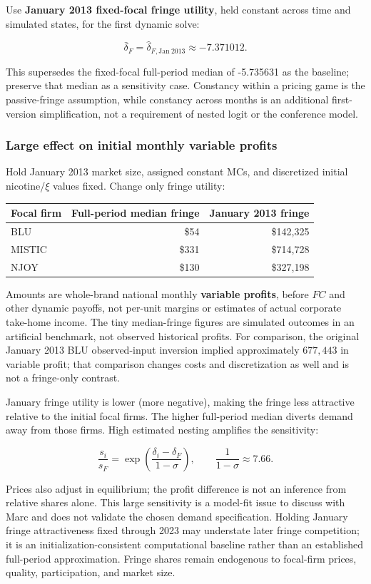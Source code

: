 \documentclass[10pt,]{article}
\begin{document}
Use \textbf{January 2013 fixed-focal fringe utility}, held constant
across time and simulated states, for the first dynamic solve:

\[
\bar\delta_F=\widehat\delta_{F,\mathrm{Jan\ 2013}}
\approx -7.371012.
\]

This supersedes the fixed-focal full-period median of -5.735631 as the
baseline; preserve that median as a sensitivity case. Constancy within a
pricing game is the passive-fringe assumption, while constancy across
months is an additional first-version simplification, not a requirement
of nested logit or the conference model.

\subsubsection{Large effect on initial monthly variable
profits}\label{large-effect-on-initial-monthly-variable-profits}

Hold January 2013 market size, assigned constant MCs, and discretized
initial nicotine/\(\xi\) values fixed. Change only fringe utility:

\begin{longtable}[]{@{}lrr@{}}
\toprule
Focal firm & Full-period median fringe & January 2013
fringe\tabularnewline
\midrule
\endhead
BLU & \$54 & \$142,325\tabularnewline
MISTIC & \$331 & \$714,728\tabularnewline
NJOY & \$130 & \$327,198\tabularnewline
\bottomrule
\end{longtable}

Amounts are whole-brand national monthly \textbf{variable profits},
before \(FC\) and other dynamic payoffs, not per-unit margins or
estimates of actual corporate take-home income. The tiny median-fringe
figures are simulated outcomes in an artificial benchmark, not observed
historical profits. For comparison, the original January 2013 BLU
observed-input inversion implied approximately \(677,443\) in variable
profit; that comparison changes costs and discretization as well and is
not a fringe-only contrast.

January fringe utility is lower (more negative), making the fringe less
attractive relative to the initial focal firms. The higher full-period
median diverts demand away from those firms. High estimated nesting
amplifies the sensitivity:

\[
\frac{s_i}{s_F}=\exp\!\left(\frac{\delta_i-\delta_F}{1-\sigma}\right),
\qquad \frac{1}{1-\sigma}\approx7.66.
\]

Prices also adjust in equilibrium; the profit difference is not an
inference from relative shares alone. This large sensitivity is a
model-fit issue to discuss with Marc and does not validate the chosen
demand specification. Holding January fringe attractiveness fixed
through 2023 may understate later fringe competition; it is an
initialization-consistent computational baseline rather than an
established full-period approximation. Fringe shares remain endogenous
to focal-firm prices, quality, participation, and market size.
\end{document}
